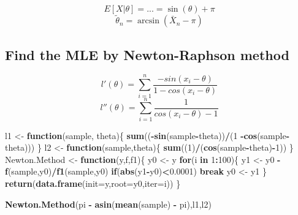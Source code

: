 \documentclass[]{article}
\newenvironment{Shaded}{\begin{snugshade}}{\end{snugshade}}
\newcommand{\ControlFlowTok}[1]{\textcolor[rgb]{0.13,0.29,0.53}{\textbf{#1}}}
\newcommand{\DataTypeTok}[1]{\textcolor[rgb]{0.13,0.29,0.53}{#1}}
\newcommand{\DecValTok}[1]{\textcolor[rgb]{0.00,0.00,0.81}{#1}}
\newcommand{\FloatTok}[1]{\textcolor[rgb]{0.00,0.00,0.81}{#1}}
\newcommand{\KeywordTok}[1]{\textcolor[rgb]{0.13,0.29,0.53}{\textbf{#1}}}
\newcommand{\NormalTok}[1]{#1}
\newcommand{\OperatorTok}[1]{\textcolor[rgb]{0.81,0.36,0.00}{\textbf{#1}}}
\newcommand{\StringTok}[1]{\textcolor[rgb]{0.31,0.60,0.02}{#1}}
\begin{document}
\[E[X|\theta]=...=\sin(\theta)+\pi\]
\[\tilde{\theta}_n = \arcsin(\bar{X}_n - \pi)\]

\hypertarget{find-the-mle-by-newton-raphson-method}{%
\subsection{Find the MLE by Newton-Raphson
method}\label{find-the-mle-by-newton-raphson-method}}

\[l'(\theta)=\sum_{i=1}^n \frac{-sin(x_i-\theta)}{1-cos(x_i-\theta)}  \]
\[l''(\theta)=\sum_{i=1}^n \frac{1}{cos(x_i-\theta)-1}\]

\begin{Shaded}
\begin{Highlighting}[]
\NormalTok{l1 <-}\StringTok{ }\ControlFlowTok{function}\NormalTok{(sample, theta)\{}
  \KeywordTok{sum}\NormalTok{((}\OperatorTok{-}\KeywordTok{sin}\NormalTok{(sample}\OperatorTok{-}\NormalTok{theta))}\OperatorTok{/}\NormalTok{(}\DecValTok{1} \OperatorTok{-}\KeywordTok{cos}\NormalTok{(sample}\OperatorTok{-}\NormalTok{theta)))   }
\NormalTok{\}}
\NormalTok{l2 <-}\StringTok{ }\ControlFlowTok{function}\NormalTok{(sample,theta)\{}
  \KeywordTok{sum}\NormalTok{((}\DecValTok{1}\NormalTok{)}\OperatorTok{/}\NormalTok{(}\KeywordTok{cos}\NormalTok{(sample}\OperatorTok{-}\NormalTok{theta)}\OperatorTok{-}\DecValTok{1}\NormalTok{))   }
\NormalTok{\}}
\NormalTok{Newton.Method <-}\StringTok{ }\ControlFlowTok{function}\NormalTok{(y,f,f1)\{}
\NormalTok{   y0 <-}\StringTok{ }\NormalTok{y}
   \ControlFlowTok{for}\NormalTok{(i }\ControlFlowTok{in} \DecValTok{1}\OperatorTok{:}\DecValTok{100}\NormalTok{)\{}
\NormalTok{    y1 <-}\StringTok{ }\NormalTok{y0 }\OperatorTok{-}\StringTok{ }\KeywordTok{f}\NormalTok{(sample,y0)}\OperatorTok{/}\KeywordTok{f1}\NormalTok{(sample,y0)}
    \ControlFlowTok{if}\NormalTok{(}\KeywordTok{abs}\NormalTok{(y1}\OperatorTok{-}\NormalTok{y0)}\OperatorTok{<}\FloatTok{0.0001}\NormalTok{) }
      \ControlFlowTok{break}
\NormalTok{    y0 <-}\StringTok{ }\NormalTok{y1}
\NormalTok{   \}}
   \KeywordTok{return}\NormalTok{(}\KeywordTok{data.frame}\NormalTok{(}\DataTypeTok{init=}\NormalTok{y,}\DataTypeTok{root=}\NormalTok{y0,}\DataTypeTok{iter=}\NormalTok{i))}
\NormalTok{\}}

\KeywordTok{Newton.Method}\NormalTok{(pi }\OperatorTok{-}\StringTok{ }\KeywordTok{asin}\NormalTok{(}\KeywordTok{mean}\NormalTok{(sample) }\OperatorTok{-}\StringTok{ }\NormalTok{pi),l1,l2)}
\end{Highlighting}
\end{Shaded}
\end{document}
